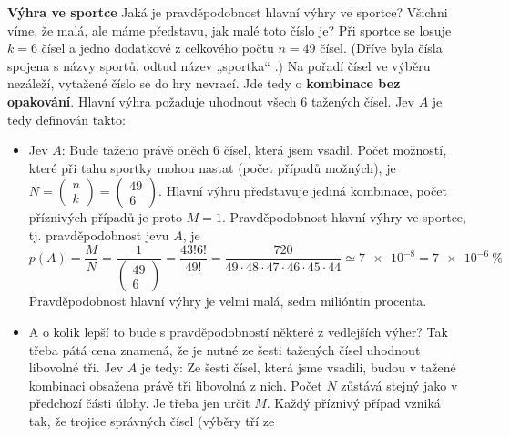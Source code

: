 \wikitextrule
\begin{example}\label{mai:exam052}
  \textbf{Výhra ve sportce}\newline\small
  Jaká je pravděpodobnost hlavní výhry ve sportce? Všichni víme, že malá, ale máme představu, jak 
  malé toto číslo je? Při sportce se losuje \(k = 6\) čísel a jedno dodatkové z celkového počtu \(n 
  = 49\) čísel. (Dříve byla čísla spojena s názvy sportů, odtud název „sportka“ .) Na pořadí čísel 
  ve výběru nezáleží, vytažené číslo se do hry nevrací. Jde tedy o \textbf{kombinace bez 
  opakování}. Hlavní výhra požaduje uhodnout všech \num{6} tažených čísel. Jev \(A\) je tedy 
  definován takto:
  
  \begin{itemize}
    \item Jev \(A\): Bude taženo právě oněch \num{6} čísel, která jsem vsadil.
          Počet možností, které při tahu sportky mohou nastat (počet případů možných), je \(N = 
          \begin{pmatrix} n \\ k\end{pmatrix} =  \begin{pmatrix} 49 \\ 6 \end{pmatrix} \). Hlavní 
          výhru představuje jediná kombinace, počet příznivých případů je proto \(M = 1\). 
          Pravděpodobnost hlavní výhry ve sportce, tj. pravděpodobnost jevu \(A\), je
          \begin{equation*}
            p(A) = \dfrac{M}{N} = \dfrac{1}{\begin{pmatrix} 49 \\ 6 \end{pmatrix}} 
                 = \dfrac{43!6!}{49!} = \dfrac{720}{49\cdot48\cdot47\cdot46\cdot45\cdot44} \simeq 
                 \num{7e-8}
                 = \SI{7e-6}{\percent}
          \end{equation*}
          Pravděpodobnost hlavní výhry je velmi malá, sedm milióntin procenta. 
    \item A o kolik lepší to bude s pravděpodobností některé z vedlejších výher? Tak třeba pátá 
          cena znamená, že je nutné ze šesti tažených čísel uhodnout libovolné tři. Jev \(A\) je 
          tedy: Ze šesti čísel, která jsme vsadili, budou v tažené kombinaci obsažena právě tři 
          libovolná z nich. Počet \(N\) zůstává stejný jako v předchozí části úlohy. Je třeba jen 
          určit \(M\). Každý příznivý případ vzniká tak, že trojice správných čísel (výběry tří ze 

\end{itemize}
\end{example}
